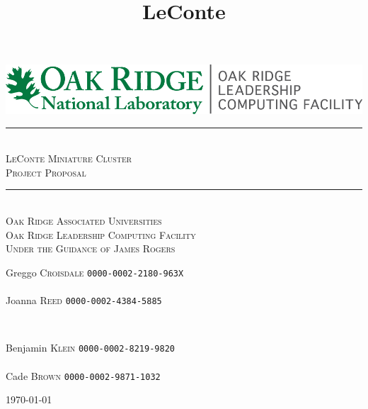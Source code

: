 \documentclass{article}
\title{LeConte}
\begin{document}
\begin{titlepage}
 \center
 \includegraphics[scale=1.5]{OLCF_color.png}\\[2cm]
 \newcommand{\sep}{\rule{\linewidth}{0.5mm}}
 \sep \\[0.4cm]
 \textsc{\huge LeConte Miniature Cluster}\\[0.4cm]
 \textsc{\large Project Proposal}\\[0.4cm]
 \sep \\[2cm]
 \textsc{\LARGE Oak Ridge Associated Universities}\\[0.5cm]
 \textsc{\Large Oak Ridge Leadership Computing Facility}\\[0.5cm]
 \textsc{\large Under the Guidance of James Rogers}\\[4.6cm]

\vfill
\begin{minipage}{0.4\textwidth}
\begin{flushleft} \large
Greggo \textsc{Croisdale} \texttt{0000-0002-2180-963X}\\~\\
Joanna \textsc{Reed} \texttt{0000-0002-4384-5885}\\
\end{flushleft}
\end{minipage}
~
\begin{minipage}{0.4\textwidth}
\begin{flushright} \large
Benjamin \textsc{Klein} \texttt{0000-0002-8219-9820}\\~\\
Cade \textsc{Brown} \texttt{0000-0002-9871-1032}\\
\end{flushright}
\end{minipage}
{\large \vfill \vspace*{\fill} \today}
\end{titlepage}
\end{document}
